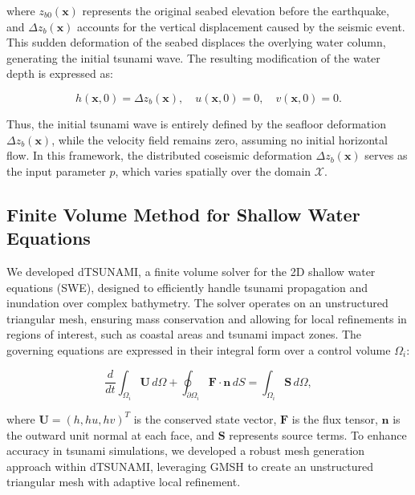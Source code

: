 where \( z_{b0}(\textbf{x}) \) represents the original seabed elevation before the earthquake, and \( \Delta z_b(\textbf{x}) \) accounts for the vertical displacement caused by the seismic event. This sudden deformation of the seabed displaces the overlying water column, generating the initial tsunami wave. The resulting modification of the water depth is expressed as:

\begin{equation}
h(\textbf{x}, 0) = \Delta z_b(\textbf{x}), \quad u(\textbf{x}, 0) = 0, \quad v(\textbf{x}, 0) = 0.
\label{eq:swe-initial}
\end{equation}

Thus, the initial tsunami wave is entirely defined by the seafloor deformation \( \Delta z_b(\textbf{x}) \), while the velocity field remains zero, assuming no initial horizontal flow. In this framework, the distributed coseismic deformation \( \Delta z_b(\textbf{x}) \) serves as the input parameter \( p \), which varies spatially over the domain \( \mathcal{X} \). 





\subsection*{Finite Volume Method for Shallow Water Equations}
\label{sec:fv_sw}

We developed dTSUNAMI, a finite volume solver for the 2D shallow water equations (SWE), designed to efficiently handle tsunami propagation and inundation over complex bathymetry. The solver operates on an unstructured triangular mesh, ensuring mass conservation and allowing for local refinements in regions of interest, such as coastal areas and tsunami impact zones. The governing equations are expressed in their integral form over a control volume \( \Omega_i \):

\begin{equation}
\frac{d}{dt} \int_{\Omega_i} \mathbf{U} \, d\Omega
+ \oint_{\partial \Omega_i} \mathbf{F} \cdot \mathbf{n} \, dS
=
\int_{\Omega_i} \mathbf{S} \, d\Omega,
\end{equation}

where \( \mathbf{U} = (h, hu, hv)^T \) is the conserved state vector, \( \mathbf{F} \) is the flux tensor, \( \mathbf{n} \) is the outward unit normal at each face, and \( \mathbf{S} \) represents source terms.
To enhance accuracy in tsunami simulations, we developed a robust mesh generation approach within dTSUNAMI, leveraging GMSH to create an unstructured triangular mesh with adaptive local refinement.

